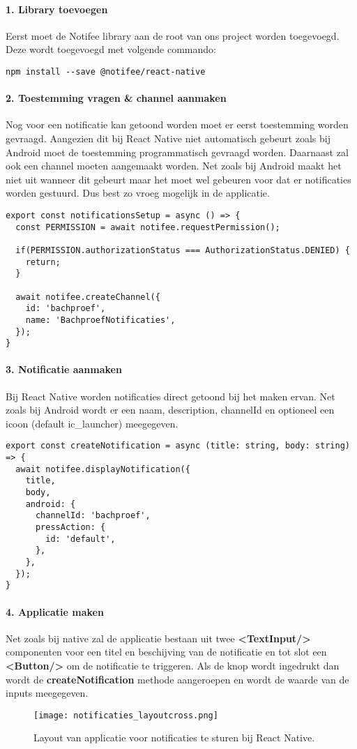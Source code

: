\paragraph{1. Library toevoegen}
Eerst moet de Notifee library aan de root van ons project worden toegevoegd. 
Deze wordt toegevoegd met volgende commando:
\begin{verbatim}
npm install --save @notifee/react-native
\end{verbatim}

\paragraph{2. Toestemming vragen \& channel aanmaken}
Nog voor een notificatie kan getoond worden moet er eerst toestemming worden gevraagd. 
Aangezien dit bij React Native niet automatisch gebeurt zoals bij Android moet de 
toestemming programmatisch gevraagd worden. Daarnaast zal ook een channel moeten aangemaakt worden.
Net zoals bij Android maakt het niet uit wanneer dit gebeurt maar het moet wel gebeuren 
voor dat er notificaties worden gestuurd. Dus best zo vroeg mogelijk in de applicatie.
\begin{verbatim}
export const notificationsSetup = async () => {
  const PERMISSION = await notifee.requestPermission();

  if(PERMISSION.authorizationStatus === AuthorizationStatus.DENIED) {
    return;
  }

  await notifee.createChannel({
    id: 'bachproef',
    name: 'BachproefNotificaties',
  });
}

\end{verbatim}

\paragraph{3. Notificatie aanmaken}
Bij React Native worden notificaties direct getoond bij het maken ervan. Net zoals bij Android 
wordt er een naam, description, channelId en optioneel een icoon (default ic\_launcher) meegegeven. 
\begin{verbatim}
export const createNotification = async (title: string, body: string) => {
  await notifee.displayNotification({
    title,
    body,
    android: {
      channelId: 'bachproef',
      pressAction: {
        id: 'default',
      },
    },
  });
}
\end{verbatim}

\paragraph{4. Applicatie maken}
Net zoals bij native zal de applicatie bestaan 
uit twee \textbf{<TextInput/>} componenten voor een titel en beschijving van de notificatie en tot slot een 
\textbf{<Button/>} om de notificatie te triggeren. Als de knop wordt ingedrukt dan wordt de 
\textbf{createNotification} methode aangeroepen en wordt de waarde van de inputs meegegeven.
\begin{figure}[H]
  \centering
  \texttt{[image: notificaties\_layoutcross.png]}
  \caption{Layout van applicatie voor notificaties te sturen bij React Native.}
\end{figure}